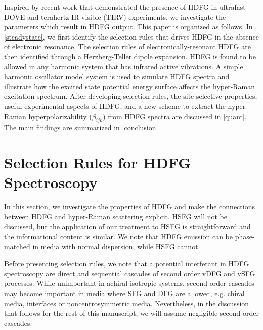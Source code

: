 \documentclass[aip, jcp, reprint, twocolumn]{revtex4-2}
\begin{document}
Inspired by recent work that demonstrated the presence of HDFG in ultrafast DOVE and terahertz-IR-visible (TIRV) experiments, we investigate the parameters which result in HDFG output. \cite{Cho2000, Bonn2024, McDonnell2024}
This paper is organized as follows.
In \autoref{steadystate}, we first identify the selection rules that drives HDFG in the absence of electronic resonance. 
The selection rules of electronically-resonant HDFG are then identified through a Herzberg-Teller dipole expansion.
HDFG is found to be allowed in any harmonic system that has infrared active vibrations.
A simple harmonic oscillator model system is used to simulate HDFG spectra and illustrate how the excited state potential energy surface affects the hyper-Raman excitation spectrum.
After developing selection rules, the site selective properties, useful experimental aspects of HDFG, and a new scheme to extract the hyper-Raman hyperpolarizability ($\beta_{ijk}$) from HDFG spectra are discussed in \autoref{quant}.
The main findings are summarized in \autoref{conclusion}.


\section{Selection Rules for HDFG Spectroscopy}\label{steadystate}

In this section, we investigate the properties of HDFG and make the connections between HDFG and hyper-Raman scattering explicit.
HSFG will not be discussed, but the application of our treatment to HSFG is straightforward and the informational content is similar.
We note that HDFG emission can be phase-matched in media with normal dispersion, while HSFG cannot.\cite{RN278}  

Before presenting selection rules, we note that a potential interferant in HDFG spectroscopy are direct and sequential cascades of second order vDFG and vSFG processes.\cite{RN297, RN302, RN301}
While unimportant in achiral isotropic systems,\cite{Belkin2000} second order cascades may become important in media where SFG and DFG are allowed, e.g. chiral media, interfaces or noncentrosymmetric media. 
Nevertheless, in the discussion that follows for the rest of this manuscript, we will assume negligible second order cascades. 
\end{document}
